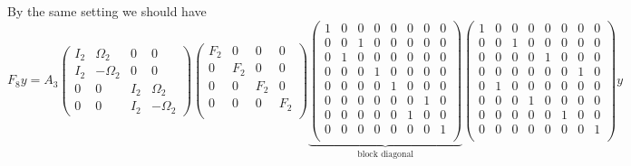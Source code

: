 By the same setting we should have \[
    F_8 y  = A_3 \begin{pmatrix}
    I_2     &\Omega_2   &   0   &   0\\
    I_2     &-\Omega_2  &   0   &   0\\
    0       &   0       &   I_2 &   \Omega_2\\
    0       &   0       &   I_2 &   -\Omega_2
\end{pmatrix}
\begin{pmatrix}
    F_2     &   0   &   0   &   0   \\
    0       &   F_2 &   0   &   0   \\
    0       &   0   &   F_2 &   0   \\
    0       &   0   &   0   &   F_2 \\
    \end{pmatrix}
    \underbrace{  \begin{pmatrix}
        1   &   0   &   0   &   0   &   0   &   0   &   0   &   0   \\
        0   &   0   &   1   &   0   &   0   &   0   &   0   &   0   \\
        0   &   1   &   0   &   0   &   0   &   0   &   0   &   0   \\
        0   &   0   &   0   &   1   &   0   &   0   &   0   &   0   \\
        0   &   0   &   0   &   0   &   1   &   0   &   0   &   0   \\
        0   &   0   &   0   &   0   &   0   &   0   &   1   &   0   \\
        0   &   0   &   0   &   0   &   0   &   1   &   0   &   0   \\
        0   &   0   &   0   &   0   &   0   &   0   &   0   &   1   \\
        \end{pmatrix}
}_{\text{block diagonal}}                      
    \begin{pmatrix}
        1   &   0   &   0   &   0   &   0   &   0   &   0   &   0   \\
        0   &   0   &   1   &   0   &   0   &   0   &   0   &   0   \\
        0   &   0   &   0   &   0   &   1   &   0   &   0   &   0   \\
        0   &   0   &   0   &   0   &   0   &   0   &   1   &   0   \\
        0   &   1   &   0   &   0   &   0   &   0   &   0   &   0   \\
        0   &   0   &   0   &   1   &   0   &   0   &   0   &   0   \\
        0   &   0   &   0   &   0   &   0   &   1   &   0   &   0   \\
        0   &   0   &   0   &   0   &   0   &   0   &   0   &   1   \\
    \end{pmatrix}y
\]
